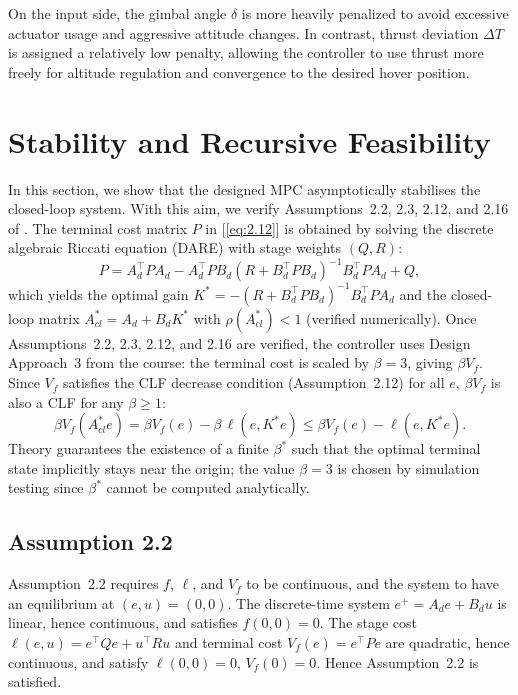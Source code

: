 \documentclass[10pt,twocolumn,twoside]{IEEEtran}
\begin{document}
On the input side, the gimbal angle $\delta$ is more heavily penalized to avoid excessive actuator usage and aggressive attitude changes. In contrast, thrust deviation $\Delta T$ is assigned a relatively low penalty, allowing the controller to use thrust more freely for altitude regulation and convergence to the desired hover position.


\section{Stability and Recursive Feasibility}

In this section, we show that the designed MPC asymptotically stabilises the
closed-loop system.
With this aim, we verify Assumptions~2.2, 2.3, 2.12, and 2.16 of
\cite{rawlings:mayne}.
The terminal cost matrix $P$ in [\ref{eq:2.12}] is obtained by solving the
discrete algebraic Riccati equation (DARE) with stage weights $(Q, R)$:
\begin{equation}
  P = A_d^\top P A_d
    - A_d^\top P B_d(R + B_d^\top P B_d)^{-1}B_d^\top P A_d + Q,
  \label{eq:dare}
\end{equation}
which yields the optimal gain $K^* = -(R + B_d^\top P B_d)^{-1} B_d^\top P A_d$
and the closed-loop matrix $A^*_{cl} = A_d + B_d K^*$ with $\rho(A^*_{cl}) < 1$
(verified numerically).
Once Assumptions~2.2, 2.3, 2.12, and 2.16 are verified, the controller uses
Design Approach~3 from the course: the terminal cost is scaled by $\beta = 3$,
giving $\beta V_f$.
Since $V_f$ satisfies the CLF decrease condition (Assumption~2.12) for all $e$,
$\beta V_f$ is also a CLF for any $\beta \geq 1$:
\begin{equation}
  \beta V_f(A^*_{cl} e)
  = \beta V_f(e) - \beta\,\ell(e, K^* e)
  \leq \beta V_f(e) - \ell(e, K^* e).
\end{equation}
Theory guarantees the existence of a finite $\beta^*$ such that the optimal
terminal state implicitly stays near the origin; the value $\beta = 3$ is
chosen by simulation testing since $\beta^*$ cannot be computed analytically.

\subsection{Assumption 2.2 \cite{rawlings:mayne}}

Assumption~2.2 requires $f$, $\ell$, and $V_f$ to be continuous, and the
system to have an equilibrium at $(e, u) = (0, 0)$.
The discrete-time system $e^+ = A_d e + B_d u$ is linear, hence continuous,
and satisfies $f(0,0) = 0$.
The stage cost $\ell(e,u) = e^\top Q e + u^\top R u$ and terminal cost
$V_f(e) = e^\top P e$ are quadratic, hence continuous, and satisfy
$\ell(0,0) = 0$, $V_f(0) = 0$.
Hence Assumption~2.2 is satisfied.
\end{document}
